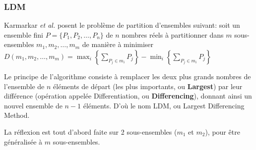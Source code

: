 \documentclass[a4paper,12pt]{report}
\theoremstyle{plain}				%
\theoremstyle{definition}				%
\begin{document}
\subsubsection{LDM}


Karmarkar \emph{et al.}
\cite{karmarkar1982differencing} posent le problème de partition
d'ensembles suivant: soit un ensemble fini
$P=\{P_1, P_2, \ldots, P_n\}$ de $n$ nombres réels à partitionner dans $m$
sous-ensembles $m_1, m_2, \ldots, m_m$ de manière à minimiser
$D(m_1, m_2, \ldots, m_m) = \max_i \left\{ \sum_{P_j \in m_i}P_j
\right\} - \min_i \left\{ \sum_{P_j \in m_i}P_j \right\}$

Le principe de l'algorithme consiste à remplacer les deux plus grands
nombres de l'ensemble de $n$ éléments de départ (les plus importants, ou
\textbf{Largest}) par leur différence (opération appelée
Differentiation, ou \textbf{Differencing}), donnant ainsi un nouvel
ensemble de $n-1$ éléments.
D'où le nom LDM, ou Largest Differencing Method.


La réflexion est tout d'abord faite sur 2 sous-ensembles ($m_1$ et
$m_2$), pour être généralisée à $m$ sous-ensembles.
\end{document}
